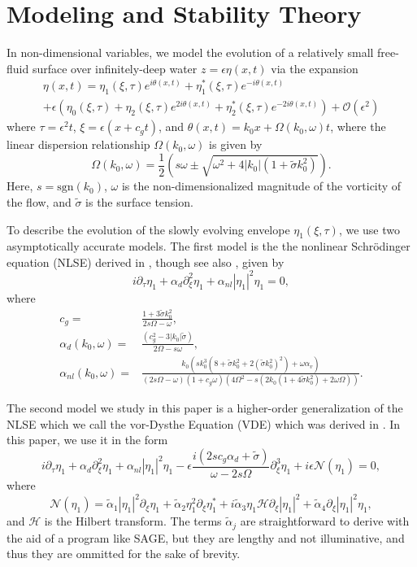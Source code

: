 \documentclass[a4paper,11pt]{article}
\newcommand{\pd}{\partial}
\begin{document}
\section*{Modeling and Stability Theory}
In non-dimensional variables, we model the evolution of a relatively small free-fluid surface over infinitely-deep water $z=\epsilon \eta(x,t)$ via the expansion 
\begin{multline*}
\eta(x,t) = \eta_{1}(\xi,\tau)e^{i\theta(x,t)} + \eta^{\ast}_{1}(\xi,\tau)e^{-i\theta(x,t)}\\
+ \epsilon\left(\eta_{0}(\xi,\tau) + \eta_{2}(\xi,\tau)e^{2i\theta(x,t)} + \eta^{\ast}_{2}(\xi,\tau)e^{-2i\theta(x,t)}\right) + \mathcal{O}\left(\epsilon^{2} \right)
\end{multline*}
where $\tau = \epsilon^{2}t$, $\xi = \epsilon(x+c_{g}t)$, and $\theta(x,t) = k_{0}x + \Omega(k_{0},\omega)t$, where the linear dispersion relationship $\Omega(k_{0},\omega)$ is given by
\[
\Omega(k_{0},\omega) = \frac{1}{2}\left(s\omega \pm \sqrt{\omega^{2} + 4|k_{0}|\left(1+\tilde{\sigma}k_{0}^{2}\right)} \right).
\]
Here, $s = \mbox{sgn}(k_{0})$, $\omega$ is the non-dimensionalized magnitude of the vorticity of the flow, and $\tilde{\sigma}$ is the surface tension.  

To describe the evolution of the slowly evolving envelope $\eta_{1}(\xi,\tau)$, we use two asymptotically accurate models.  The first model is the the nonlinear Schr\"{o}dinger equation (NLSE) derived in \cite{curtis8}, though see also \cite{thomas2012nonlinear}, given by 
\[
i\pd_{\tau}\eta_{1} + \alpha_{d}\pd_{\xi}^{2}\eta_{1} + \alpha_{nl}\left|\eta_{1} \right|^{2}\eta_{1} = 0, 
\]
where 
\begin{align*}
c_{g} = & \frac{1+3\tilde{\sigma}k_{0}^{2}}{2s\Omega - \omega},\\
\alpha_{d}(k_{0},\omega) = & \frac{(c^2_{g} - 3|k_{0}|\tilde{\sigma})}{2\Omega-s\omega},\\
\alpha_{nl}(k_{0},\omega) = & \frac{k_{0}\left( sk_{0}^{3}\left(8 + \tilde{\sigma}k_{0}^{2} + 2(\tilde{\sigma}k_{0}^{2})^{2}\right) + \omega \alpha_{v}\right)}{\left(2s\Omega -\omega\right)(1+c_{g}\omega)\left(4\Omega^2-s(2k_{0}(1+4\tilde{\sigma}k_{0}^{2})+2\omega\Omega)\right)}.
\end{align*}

The second model we study in this paper is a higher-order generalization of the NLSE which we call the vor-Dysthe Equation (VDE) which was derived in \cite{curtis8}.  In this paper, we use it in the form 
\[
i\pd_{\tau}\eta_{1} + \alpha_{d}\pd_{\xi}^{2}\eta_{1} + \alpha_{nl}\left|\eta_{1} \right|^{2}\eta_{1} - \epsilon\frac{i(2sc_{g}\alpha_{d}+\tilde{\sigma})}{\omega-2s\Omega}\pd^{3}_{\xi}\eta_{1} + i\epsilon\mathcal{N}(\eta_{1}) = 0, 
\]
where
\[
\mathcal{N}(\eta_{1}) = \tilde{\alpha}_{1}\left|\eta_{1}\right|^{2}\pd_{\xi}\eta_{1} + \tilde{\alpha}_{2} \eta_{1}^{2}\pd_{\xi}\eta^{\ast}_{1} + i\tilde{\alpha}_{3}\eta_{1}\mathcal{H}\pd_{\xi}\left| \eta_{1}\right|^{2} + \tilde{\alpha}_{4}\pd_{\xi}\left| \eta_{1}\right|^{2}\eta_{1},
\]
and $\mathcal{H}$ is the Hilbert transform.  The terms $\tilde{\alpha}_{j}$ are straightforward to derive with the aid of a program like SAGE, but they are lengthy and not illuminative, and thus they are ommitted for the sake of brevity.  
\end{document}
